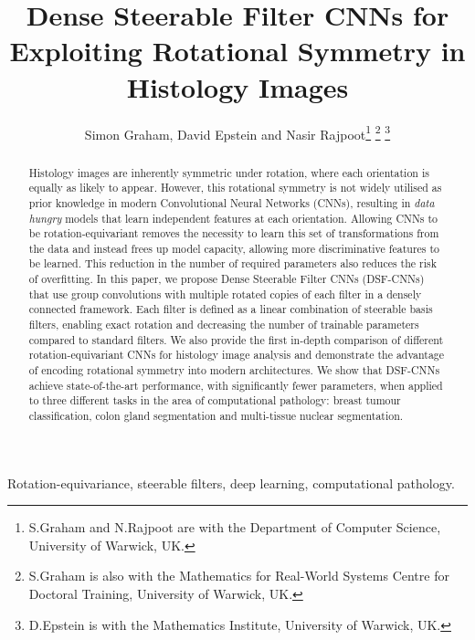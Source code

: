 \documentclass[journal]{IEEEtran}
\begin{document}


\title{Dense Steerable Filter CNNs for Exploiting Rotational Symmetry in Histology Images}
	


	
	
	\author{Simon Graham, David Epstein
		and Nasir Rajpoot\thanks{S.Graham and N.Rajpoot are with the Department of Computer Science, University of Warwick, UK.}
		\thanks{S.Graham is also with the Mathematics for Real-World Systems Centre for Doctoral Training, University of Warwick, UK.}
		\thanks{D.Epstein is with the Mathematics Institute, University of Warwick, UK.}
		}
	
\maketitle
	

\begin{abstract}
Histology images are inherently symmetric under rotation, where each orientation is equally as likely to appear. However, this rotational symmetry is not widely utilised as prior knowledge in modern Convolutional Neural Networks (CNNs), resulting in \textit{data hungry} models that learn independent features at each orientation. Allowing CNNs to be rotation-equivariant removes the necessity to learn this set of transformations from the data and instead frees up model capacity, allowing more discriminative features to be learned. This reduction in the number of required parameters also reduces the risk of overfitting. In this paper, we propose Dense Steerable Filter CNNs (DSF-CNNs) that use group convolutions with multiple rotated copies of each filter in a densely connected framework. Each filter is defined as a linear combination of steerable basis filters, enabling exact rotation and decreasing the number of trainable parameters compared to standard filters. We also provide the first in-depth comparison of different rotation-equivariant CNNs for histology image analysis and demonstrate the advantage of encoding rotational symmetry into modern architectures. We show that DSF-CNNs achieve state-of-the-art performance, with significantly fewer parameters, when applied to three different tasks in the area of computational pathology: breast tumour classification, colon gland segmentation and multi-tissue nuclear segmentation. 
\end{abstract}

\begin{IEEEkeywords}
		Rotation-equivariance, steerable filters, deep learning, computational pathology.
	\end{IEEEkeywords}
\end{document}
